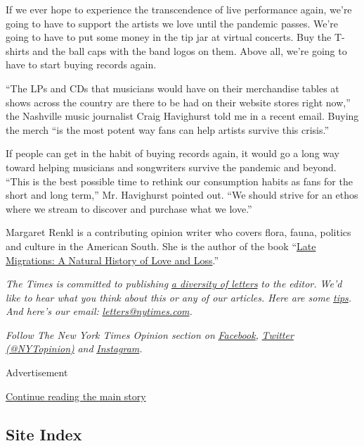 If we ever hope to experience the transcendence of live performance
again, we're going to have to support the artists we love until the
pandemic passes. We're going to have to put some money in the tip jar at
virtual concerts. Buy the T-shirts and the ball caps with the band logos
on them. Above all, we're going to have to start buying records again.

``The LPs and CDs that musicians would have on their merchandise tables
at shows across the country are there to be had on their website stores
right now,'' the Nashville music journalist Craig Havighurst told me in
a recent email. Buying the merch ``is the most potent way fans can help
artists survive this crisis.''

If people can get in the habit of buying records again, it would go a
long way toward helping musicians and songwriters survive the pandemic
and beyond. ``This is the best possible time to rethink our consumption
habits as fans for the short and long term,'' Mr. Havighurst pointed
out. ``We should strive for an ethos where we stream to discover and
purchase what we love.''

Margaret Renkl is a contributing opinion writer who covers flora, fauna,
politics and culture in the American South. She is the author of the
book ``\href{https://milkweed.org/book/late-migrations}{Late Migrations:
A Natural History of Love and Loss}.''

\emph{The Times is committed to publishing}
\href{https://www.nytimes.com/2019/01/31/opinion/letters/letters-to-editor-new-york-times-women.html}{\emph{a
diversity of letters}} \emph{to the editor. We'd like to hear what you
think about this or any of our articles. Here are some}
\href{https://help.nytimes.com/hc/en-us/articles/115014925288-How-to-submit-a-letter-to-the-editor}{\emph{tips}}\emph{.
And here's our email:}
\href{mailto:letters@nytimes.com}{\emph{letters@nytimes.com}}\emph{.}

\emph{Follow The New York Times Opinion section on}
\href{https://www.facebook.com/nytopinion}{\emph{Facebook}}\emph{,}
\href{http://twitter.com/NYTOpinion}{\emph{Twitter (@NYTopinion)}}
\emph{and}
\href{https://www.instagram.com/nytopinion/}{\emph{Instagram}}\emph{.}

Advertisement

\protect\hyperlink{after-bottom}{Continue reading the main story}

\hypertarget{site-index}{%
\subsection{Site Index}\label{site-index}}

